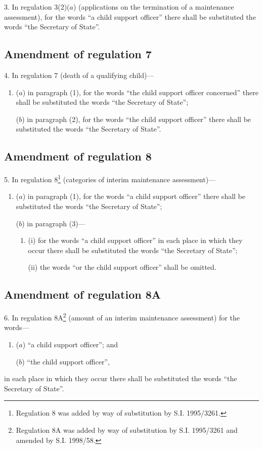 \documentclass[12pt,a4paper]{article}
\begin{document}
3.  In regulation 3(2)($a$) (applications on the termination of a maintenance assessment), for the words “a child support officer” there shall be substituted the words “the Secretary of State”.

\subsection[4. Amendment of regulation 7]{Amendment of regulation 7}

4.  In regulation 7 (death of a qualifying child)---
\begin{enumerate}\item[]
($a$) in paragraph (1), for the words “the child support officer concerned” there shall be substituted the words “the Secretary of State”;

($b$) in paragraph (2), for the words “the child support officer” there shall be substituted the words “the Secretary of State”.
\end{enumerate}

\subsection[5. Amendment of regulation 8]{Amendment of regulation 8}

5.  In regulation 8\footnote{\frenchspacing Regulation 8 was added by way of substitution by S.I. 1995/3261.} (categories of interim maintenance assessment)---
\begin{enumerate}\item[]
($a$) in paragraph (1), for the words “a child support officer” there shall be substituted the words “the Secretary of State”;

($b$) in paragraph (3)---
\begin{enumerate}\item[]
(i) for the words “a child support officer” in each place in which they occur there shall be substituted the words “the Secretary of State”;

(ii) the words “or the child support officer” shall be omitted.
\end{enumerate}
\end{enumerate}

\subsection[6. Amendment of regulation 8A]{Amendment of regulation 8A}

6.  In regulation 8A\footnote{\frenchspacing Regulation 8A was added by way of substitution by S.I. 1995/3261 and amended by S.I. 1998/58.} (amount of an interim maintenance assessment) for the words---
\begin{enumerate}\item[]
($a$) “a child support officer”; and

($b$) “the child support officer”,
\end{enumerate}
in each place in which they occur there shall be substituted the words “the Secretary of State”.
\end{document}
